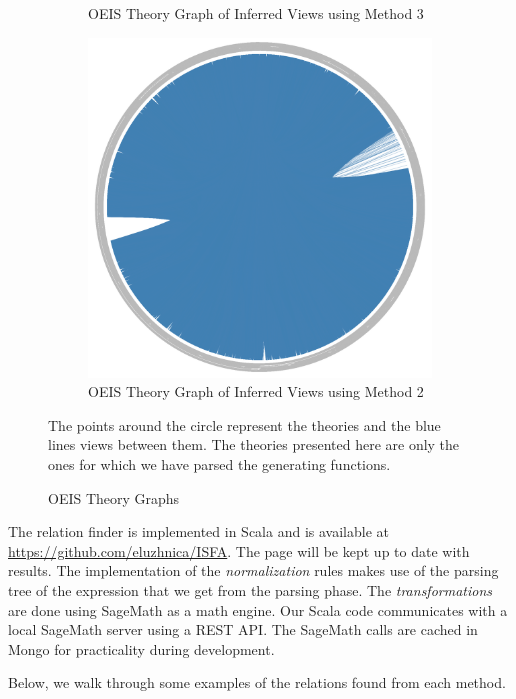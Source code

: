 \begin{figure}[!h]
\begin{subfigure}{0.3\textwidth}
\caption{OEIS Theory Graph of Inferred Views using Method 3 \label{fig:after}}
\end{subfigure}
\begin{subfigure}{0.3\textwidth}
\centerline{\includegraphics[scale=0.17]{after2}}
\caption{OEIS Theory Graph of Inferred Views using Method 2 \label{fig:after2}}
\end{subfigure}
\medskip
\small

The points around the circle represent the theories and the blue lines views between them. The theories presented
here are only the ones for which we have parsed the generating functions.

\caption{OEIS Theory Graphs}

\end{figure}

The relation finder is implemented in Scala and is available at \url{https://github.com/eluzhnica/ISFA}. The page
will be kept up to date with results. The implementation of the \emph{normalization} rules makes use of the parsing
tree of the expression that we get from the parsing phase. The \emph{transformations} are done using SageMath as a
math engine. Our Scala code communicates with a local SageMath server using a REST API. The SageMath calls are cached
 in Mongo for practicality during development.

Below, we walk through some examples of the relations found from each method.
